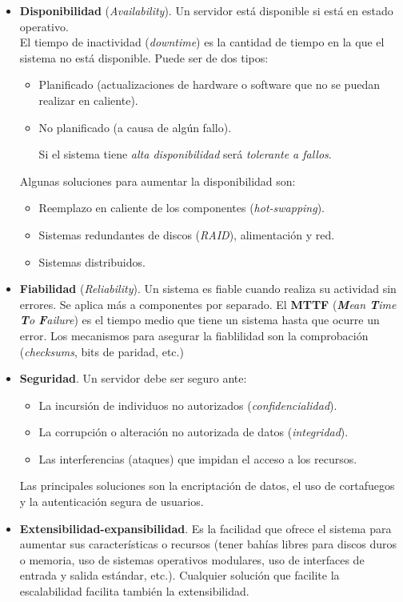 \documentclass[12pt,spanish]{article}
\begin{document}
\begin{itemize}
	\item \textbf{Disponibilidad} (\textit{Availability}). Un servidor está disponible si está en estado operativo.\\ El tiempo de inactividad (\textit{downtime}) es la cantidad de tiempo en la que el sistema no está disponible. Puede ser de dos tipos:
	\begin{itemize}
		\item Planificado (actualizaciones de hardware o software que no se puedan realizar en caliente).
		\item No planificado (a causa de algún fallo).
		
		\rightarrow Si el sistema tiene \emph{alta disponibilidad} será \emph{tolerante a fallos}.
	\end{itemize}
	\newpage
	Algunas soluciones para aumentar la disponibilidad son:
	\begin{itemize}
		\item Reemplazo en caliente de los componentes (\textit{hot-swapping}).
		\item Sistemas redundantes de discos (\textit{RAID}), alimentación y red.
		\item Sistemas distribuidos.
	\end{itemize}
	\item \textbf{Fiabilidad} (\textit{Reliability}). Un sistema es fiable cuando realiza su actividad sin errores. Se aplica más a componentes por separado. El \textbf{MTTF} (\textit{\textbf{M}ean \textbf{T}ime \textbf{T}o \textbf{F}ailure}) es el tiempo medio que tiene un sistema hasta que ocurre un error. Los mecanismos para asegurar la fiablilidad son la comprobación (\textit{checksums}, bits de paridad, etc.)
	\item \textbf{Seguridad}. Un servidor debe ser seguro ante:
	\begin{itemize}
		\item La incursión de individuos no autorizados (\textit{confidencialidad}).
		\item La corrupción o alteración no autorizada de datos (\textit{integridad}).
		\item Las interferencias (ataques) que impidan el acceso a los recursos.
	\end{itemize}
	Las principales soluciones son la encriptación de datos, el uso de cortafuegos y la autenticación segura de usuarios.
	\item \textbf{Extensibilidad-expansibilidad}. Es la facilidad que ofrece el sistema para aumentar sus características o recursos (tener bahías libres para discos duros o memoria, uso de sistemas operativos modulares, uso de interfaces de entrada y salida estándar, etc.). Cualquier solución que facilite la escalabilidad facilita también la extensibilidad.

\end{itemize}
\end{document}
